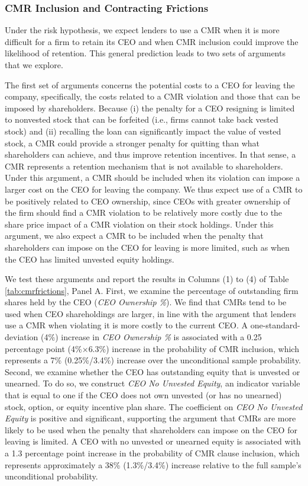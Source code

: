 \documentclass[a4paper,12pt]{article}
\begin{document}
\subsubsection{CMR Inclusion and Contracting Frictions}

Under the risk hypothesis, we expect lenders to use a CMR when it is more difficult for a firm to retain its CEO and when CMR inclusion could improve the likelihood of retention.
This general prediction leads to two sets of arguments that we explore.

The first set of arguments concerns the potential costs to a CEO for leaving the company, specifically, the costs related to a CMR violation and those that can be imposed by shareholders.
Because (i) the penalty for a CEO resigning is limited to nonvested stock that can be forfeited (i.e., firms cannot take back vested stock) and (ii) recalling the loan can significantly impact the value of vested stock, a CMR could provide a stronger penalty for quitting than what shareholders can achieve, and thus improve retention incentives.
In that sense, a CMR represents a retention mechanism that is not available to shareholders.
Under this argument, a CMR should be included when its violation can impose a larger cost on the CEO for leaving the company.
We thus expect use of a CMR to be positively related to CEO ownership, since CEOs with greater ownership of the firm should find a CMR violation to be relatively more costly due to the share price impact of a CMR violation on their stock holdings.
Under this argument, we also expect a CMR to be included when the penalty that shareholders can impose on the CEO for leaving is more limited, such as when the CEO has limited unvested equity holdings.



We test these arguments and report the results in Columns (1) to (4) of Table \ref{tab:cmrfrictions}, Panel A.
First, we examine the percentage of outstanding firm shares held by the CEO (\textit{CEO Ownership \%}).
We find that CMRs tend to be used when CEO shareholdings are larger, in line with the argument that lenders use a CMR when violating it is more costly to the current CEO.
A one-standard-deviation (4\%) increase in \textit{CEO Ownership \%} is associated with a 0.25 percentage point (4\%$\times$6.3\%) increase in the probability of CMR inclusion, which represents a 7\% (0.25\%/3.4\%) increase over the unconditional sample probability.
Second, we examine whether the CEO has outstanding equity that is unvested or unearned.
To do so, we construct \textit{CEO No Unvested Equity}, an indicator variable that is equal to one if the CEO does not own unvested (or has no unearned) stock, option, or equity incentive plan share.
The coefficient on \textit{CEO No Unvested Equity} is positive and significant, supporting the argument that CMRs are more likely to be used when the penalty that shareholders can impose on the CEO for leaving is limited.
A CEO with no unvested or unearned equity is associated with a 1.3 percentage point increase in the probability of CMR clause inclusion, which represents approximately a 38\% (1.3\%/3.4\%) increase relative to the full sample's unconditional probability.
\end{document}
